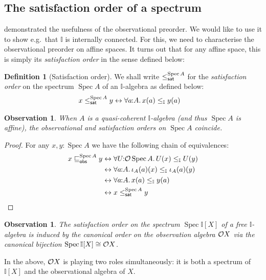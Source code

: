 \documentclass[a4paper,12pt]{amsart}
\newtheorem{observation}[theorem]{Observation}
\theoremstyle{definition}
\newtheorem{definition}[theorem]{Definition}
\newcommand{\mbb}[1]{\mathbb{#1}}
\newcommand{\I}{\mbb I}
\newcommand{\fa}[2]{\forall #1\!\colon\!\!#2\mathpunct{.}}
\newcommand{\eq}{\leftrightarrow}
\newcommand{\spec}{\operatorname{Spec}}
\begin{document}
\subsection{The satisfaction order of a spectrum}

 demonstrated the usefulness of the observational preorder. We would like to use it to show e.g.\ that $\I$ is internally connected. For this, we need to characterise the observational preorder on affine spaces. It turns out that for any affine space, this is simply its \emph{satisfaction order} in the sense defined below:


\begin{definition}[Satisfaction order]
  We shall write $\satle[\spec{A}]$ for the \emph{satisfaction order} on the spectrum $\spec{A}$ of an $\I$-algebra as defined below:
  \begin{align*}
    x\satle[\spec{A}] y 
    &\eq \fa{a}{A}
    x(a) \le_\I y(a) 
  \end{align*}
\end{definition}


\begin{observation}\label{lem:specorderofaffine}
  When $A$ is a quasi-coherent $\I$-algebra (and thus $\spec{A}$ is affine), the observational and satisfaction orders on $\spec{A}$ coincide.
\end{observation}
\begin{proof}
  For any $x,y:\spec{A}$ we have the following chain of equivalences:
  \begin{align*}
    x\obsle[\spec{A}] y 
    &\eq 
    \fa{U}{\opens\spec{A}} U(x) \le_{\I} U(y)
    \\ 
    &\eq 
    \fa{a}{A} 
    \iota_A(a)(x)
    \le_\I
    \iota_A(a)(y)
    \\ 
    &\eq 
    \fa{a}{A} 
    x(a)
    \le_\I
    y(a)
    \\ 
    &\eq 
    x\satle[\spec{A}] y
    \qedhere
  \end{align*}
\end{proof}

\begin{observation}
  The satisfaction order on the spectrum $\spec{\I[X]}$ of a free $\I$-algebra is induced by the canonical order on the \emph{observation algebra} $\mathcal{O}{X}$ via the canonical bijection $\spec{\I[X]}\cong \opens{X}$.
\end{observation}

In the above, $\mathcal{O}{X}$ is playing two roles simultaneously: it is both a spectrum of $\I[X]$ and the observational algebra of $X$.
\end{document}
